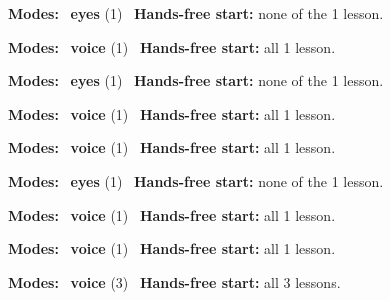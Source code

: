 \expandafter\def\csname hlchaptermodality114\endcsname{%
  {\small\noindent
    \textbf{Modes:} \hlsightsign{}~\textbf{eyes} (1)\quad
    \hlvoicesign{}~\textbf{Hands-free start:} none of the 1 lesson.%
    \par}\medskip
}

\expandafter\def\csname hlchaptermodality115\endcsname{%
  {\small\noindent
    \textbf{Modes:} \hlvoicesign{}~\textbf{voice} (1)\quad
    \hlvoicesign{}~\textbf{Hands-free start:} all 1 lesson.%
    \par}\medskip
}

\expandafter\def\csname hlchaptermodality116\endcsname{%
  {\small\noindent
    \textbf{Modes:} \hlsightsign{}~\textbf{eyes} (1)\quad
    \hlvoicesign{}~\textbf{Hands-free start:} none of the 1 lesson.%
    \par}\medskip
}

\expandafter\def\csname hlchaptermodality117\endcsname{%
  {\small\noindent
    \textbf{Modes:} \hlvoicesign{}~\textbf{voice} (1)\quad
    \hlvoicesign{}~\textbf{Hands-free start:} all 1 lesson.%
    \par}\medskip
}

\expandafter\def\csname hlchaptermodality118\endcsname{%
  {\small\noindent
    \textbf{Modes:} \hlvoicesign{}~\textbf{voice} (1)\quad
    \hlvoicesign{}~\textbf{Hands-free start:} all 1 lesson.%
    \par}\medskip
}

\expandafter\def\csname hlchaptermodality119\endcsname{%
  {\small\noindent
    \textbf{Modes:} \hlsightsign{}~\textbf{eyes} (1)\quad
    \hlvoicesign{}~\textbf{Hands-free start:} none of the 1 lesson.%
    \par}\medskip
}

\expandafter\def\csname hlchaptermodality120\endcsname{%
  {\small\noindent
    \textbf{Modes:} \hlvoicesign{}~\textbf{voice} (1)\quad
    \hlvoicesign{}~\textbf{Hands-free start:} all 1 lesson.%
    \par}\medskip
}

\expandafter\def\csname hlchaptermodality121\endcsname{%
  {\small\noindent
    \textbf{Modes:} \hlvoicesign{}~\textbf{voice} (1)\quad
    \hlvoicesign{}~\textbf{Hands-free start:} all 1 lesson.%
    \par}\medskip
}

\expandafter\def\csname hlchaptermodality122\endcsname{%
  {\small\noindent
    \textbf{Modes:} \hlvoicesign{}~\textbf{voice} (3)\quad
    \hlvoicesign{}~\textbf{Hands-free start:} all 3 lessons.%
    \par}\medskip
}

